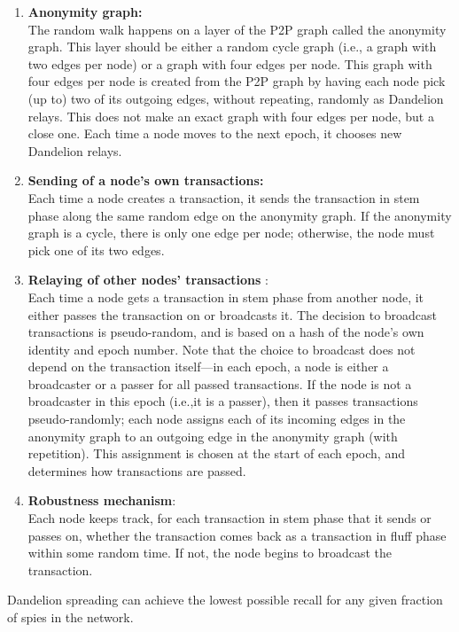 \begin{enumerate}
	\item \textbf{Anonymity graph:}\\ The random walk happens on a layer of the P2P graph called the anonymity graph. This layer should be either a random cycle graph (i.e., a graph with two edges per node) or a graph with four edges per node. This graph with four edges per node is created from the P2P graph by having each node pick (up to) two of its outgoing edges, without repeating, randomly as Dandelion relays. This does not make an exact graph with four edges per node, but a close one. Each time a node moves to the next epoch, it chooses new Dandelion relays.
	\item \textbf{Sending of a node’s own transactions:}\\ Each time a node creates a transaction, it sends the transaction in stem phase along the same random edge on the anonymity graph. If the anonymity graph is a cycle, there is only one edge per node; otherwise, the node must pick one of its two edges.
	\item \textbf{Relaying of other nodes’ transactions} : \\  Each time a node gets a transaction in stem phase from another node, it either passes the transaction on or broadcasts it. The decision to broadcast transactions is pseudo-random, and is based on a hash of the node’s own identity and epoch number. Note that the choice to broadcast does not depend on the transaction itself—in each epoch, a node is either a broadcaster or a passer for all passed transactions. If the node is not a broadcaster in this epoch (i.e.,it is a passer), then it passes transactions pseudo-randomly; each node assigns each of its incoming edges in the anonymity graph to an outgoing edge in the anonymity graph (with repetition). This assignment is chosen at the start of each epoch, and determines how transactions are passed.
	\item \textbf{Robustness mechanism}:\\ Each node keeps track, for each transaction in stem phase that it sends or passes on, whether the transaction comes back as a transaction in fluff phase within some random time. If not, the node begins to broadcast the transaction.
\end{enumerate}
Dandelion spreading can achieve the lowest possible recall for any given fraction of spies in the network. 
